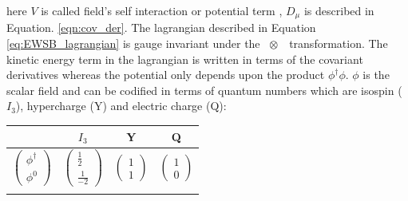 here $V$ is called field's self interaction or potential term , $D_{\mu}$ is described in Equation. \ref{eqn:cov_der}. 
The lagrangian described in Equation 
\ref{eq:EWSB_lagrangian} is gauge invariant under the ~\sutwol$\otimes$~\uoneg~transformation. The kinetic energy term in the lagrangian is written 
in terms of the covariant derivatives whereas the potential only depends upon the product $\phi^{\dag}\phi$. 
$\phi$ is the scalar field and can be codified in terms of quantum numbers which are isospin ($I_3$), hypercharge (Y) and electric charge (Q):
 \begin{center}
 \begin{tabular}{cccc}
   \hline\hline
  & $I_{3}$ & Y & Q  \\ \hline
  $\left(\begin{array}{c}\phi^{\dag} \\ \phi^{0} \end{array}\right)$ &$\left(\begin{array}{c}\frac{1}{2} \\ \frac{1}{-2} \end{array}\right)$ & $\left(\begin{array}{c} 1 \\ 1 \end{array}\right)$ & $\left(\begin{array}{c} 1 \\ 0 \end{array}\right)$\\   
  \hline
  \label{quantum_numbers}
 \end{tabular}
  \end{center} 


